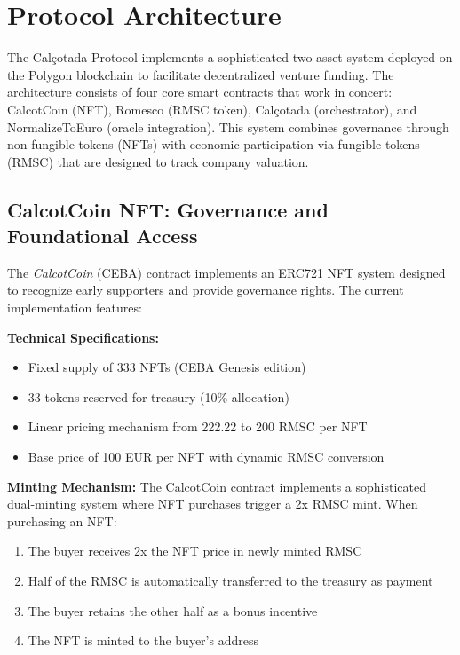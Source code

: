\documentclass[conference]{IEEEtran}
\begin{document}
\section{Protocol Architecture}


% 

The Calçotada Protocol implements a sophisticated two-asset system deployed on the Polygon blockchain to facilitate decentralized venture funding. The architecture consists of four core smart contracts that work in concert: CalcotCoin (NFT), Romesco (RMSC token), Calçotada (orchestrator), and NormalizeToEuro (oracle integration). This system combines governance through non-fungible tokens (NFTs) with economic participation via fungible tokens (RMSC) that are designed to track company valuation.

\subsection{CalcotCoin NFT: Governance and Foundational Access}

The \textit{CalcotCoin} (CEBA) contract implements an ERC721 NFT system designed to recognize early supporters and provide governance rights. The current implementation features:

\textbf{Technical Specifications:}
\begin{itemize}
    \item Fixed supply of 333 NFTs (CEBA Genesis edition)
    \item 33 tokens reserved for treasury (10\% allocation)
    \item Linear pricing mechanism from 222.22 to 200 RMSC per NFT
    \item Base price of 100 EUR per NFT with dynamic RMSC conversion
\end{itemize}

\textbf{Minting Mechanism:}
The CalcotCoin contract implements a sophisticated dual-minting system where NFT purchases trigger a 2x RMSC mint. When purchasing an NFT:
\begin{enumerate}
    \item The buyer receives 2x the NFT price in newly minted RMSC
    \item Half of the RMSC is automatically transferred to the treasury as payment
    \item The buyer retains the other half as a bonus incentive
    \item The NFT is minted to the buyer's address
\end{enumerate}
\end{document}
